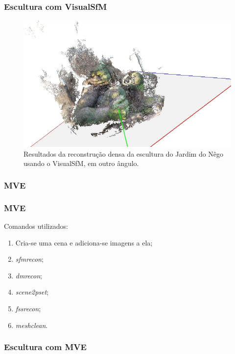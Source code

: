 \documentclass[table, usenames, svgnames, xcolor=dvipsnames]{beamer}
\begin{document}
\begin{frame}
\frametitle{\textbf{Escultura com VisualSfM}}
	\begin{figure}[!h]
		\centering
		\includegraphics[width=0.8\linewidth]{figs/guerreirovisualsfmdmr2.jpg}
		\caption{%
		Resultados da reconstrução densa da escultura do Jardim do Nêgo usando o VisualSfM, em outro ângulo.
		}\label{fig:reconstrucaoDensaIndioVisualSFM}
	\end{figure}
\end{frame}


\subsubsection{MVE}
\begin{frame}
\frametitle{\textbf{MVE}}
	Comandos utilizados:
	\begin{center}
		\begin{enumerate}
			\item {Cria-se uma cena e adiciona-se imagens a ela;}
			\item {\emph{sfmrecon};}
			\item {\emph{dmrecon};}
			\item {\emph{scene2pset};}
			\item {\emph{fssrecon};}
			\item {\emph{meshclean}.}
		\end{enumerate}
	\end{center}
\end{frame}

\begin{frame}
\frametitle{\textbf{Escultura com MVE}}
	\begin{center}
	\end{center}
\end{frame}
\end{document}
